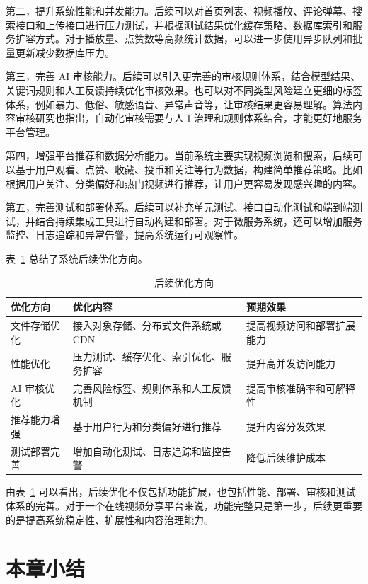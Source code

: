 第二，提升系统性能和并发能力。后续可以对首页列表、视频播放、评论弹幕、搜索接口和上传接口进行压力测试，并根据测试结果优化缓存策略、数据库索引和服务扩容方式。对于播放量、点赞数等高频统计数据，可以进一步使用异步队列和批量更新减少数据库压力。

第三，完善 AI 审核能力。后续可以引入更完善的审核规则体系，结合模型结果、关键词规则和人工反馈持续优化审核效果。也可以对不同类型风险建立更细的标签体系，例如暴力、低俗、敏感语音、异常声音等，让审核结果更容易理解。算法内容审核研究也指出，自动化审核需要与人工治理和规则体系结合，才能更好地服务平台管理\cite{gorwa2020algorithmic}。

第四，增强平台推荐和数据分析能力。当前系统主要实现视频浏览和搜索，后续可以基于用户观看、点赞、收藏、投币和关注等行为数据，构建简单推荐策略。比如根据用户关注、分类偏好和热门视频进行推荐，让用户更容易发现感兴趣的内容。

第五，完善测试和部署体系。后续可以补充单元测试、接口自动化测试和端到端测试，并结合持续集成工具进行自动构建和部署。对于微服务系统，还可以增加服务监控、日志追踪和异常告警，提高系统运行可观察性。

表~\ref{tab:future-work} 总结了系统后续优化方向。

\begin{table}[htbp]
  \centering
  \caption{后续优化方向}
  \label{tab:future-work}
  \begin{tabular}{p{}p{}p{}}
    \hline
    \textbf{优化方向} & \textbf{优化内容} & \textbf{预期效果} \\
    \hline
    文件存储优化 & 接入对象存储、分布式文件系统或 CDN & 提高视频访问和部署扩展能力 \\
    性能优化 & 压力测试、缓存优化、索引优化、服务扩容 & 提升高并发访问能力 \\
    AI 审核优化 & 完善风险标签、规则体系和人工反馈机制 & 提高审核准确率和可解释性 \\
    推荐能力增强 & 基于用户行为和分类偏好进行推荐 & 提升内容分发效果 \\
    测试部署完善 & 增加自动化测试、日志追踪和监控告警 & 降低后续维护成本 \\
    \hline
  \end{tabular}
\end{table}

由表~\ref{tab:future-work} 可以看出，后续优化不仅包括功能扩展，也包括性能、部署、审核和测试体系的完善。对于一个在线视频分享平台来说，功能完整只是第一步，后续更重要的是提高系统稳定性、扩展性和内容治理能力。

\section{本章小结}
\label{sec:chapter7-summary}

